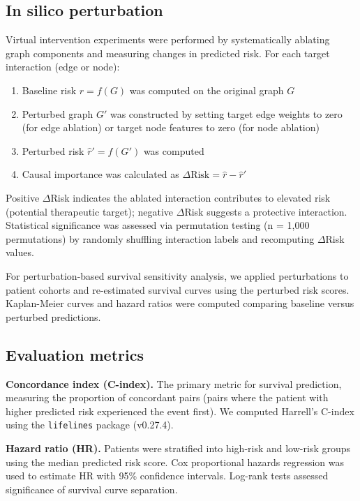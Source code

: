 \documentclass[pdflatex,sn-nature]{sn-jnl}%
\theoremstyle{thmstyleone}%
\theoremstyle{thmstyletwo}%
\theoremstyle{thmstylethree}%
\begin{document}
\subsection{In silico perturbation}

Virtual intervention experiments were performed by systematically ablating graph components and measuring changes in predicted risk. For each target interaction (edge or node):
\begin{enumerate}
\item Baseline risk $\hat{r} = f(G)$ was computed on the original graph $G$
\item Perturbed graph $G'$ was constructed by setting target edge weights to zero (for edge ablation) or target node features to zero (for node ablation)
\item Perturbed risk $\hat{r}' = f(G')$ was computed
\item Causal importance was calculated as $\Delta\text{Risk} = \hat{r} - \hat{r}'$
\end{enumerate}

Positive $\Delta$Risk indicates the ablated interaction contributes to elevated risk (potential therapeutic target); negative $\Delta$Risk suggests a protective interaction. Statistical significance was assessed via permutation testing (n = 1,000 permutations) by randomly shuffling interaction labels and recomputing $\Delta$Risk values.

For perturbation-based survival sensitivity analysis, we applied perturbations to patient cohorts and re-estimated survival curves using the perturbed risk scores. Kaplan-Meier curves and hazard ratios were computed comparing baseline versus perturbed predictions.

\subsection{Evaluation metrics}

\textbf{Concordance index (C-index).} The primary metric for survival prediction, measuring the proportion of concordant pairs (pairs where the patient with higher predicted risk experienced the event first). We computed Harrell's C-index using the \texttt{lifelines} package (v0.27.4)\cite{bib30}.

\textbf{Hazard ratio (HR).} Patients were stratified into high-risk and low-risk groups using the median predicted risk score. Cox proportional hazards regression was used to estimate HR with 95\% confidence intervals. Log-rank tests assessed significance of survival curve separation.
\end{document}
